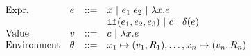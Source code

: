 \documentclass[a4paper,11pt]{article}
\newcommand{\wq}[1]{\textcolor[rgb]{.50,0.0,0.7}{ #1}}
\theoremstyle{definition}
\begin{document}

\[\begin{array}{llll}
\mbox{Expr.} & \expr & ::= & x ~|~ \expr_1 \eapp \expr_2 
 ~|~ \lambda x. \expr%
    \\
%
             & & & %
  \eif(\expr_1, \expr_2, \expr_3) ~|~
\econst ~|~ \eop(\expr)  %
    \\
%
\mbox{Value} & \valr & ::= & \econst ~|~ \lambda x. \expr
    \\
%
\mbox{Environment} & \env & ::= & x_1 \mapsto (\valr_1, \adapt_1), \ldots, x_n \mapsto (\valr_n,\adapt_n)
\end{array}\]
\end{document}
